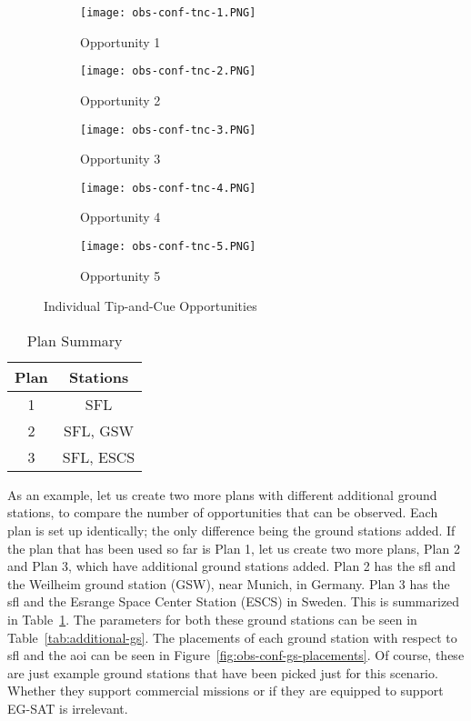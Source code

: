 \begin{figure}[h]
    \centering
    \begin{subfigure}[b]{0.32\textwidth}
	\centering
	\texttt{[image: obs-conf-tnc-1.PNG]} 
	\caption{Opportunity 1}
	\label{fig:obs-conf-tnc-1} 
    \end{subfigure}
    \hfill
    \begin{subfigure}[b]{0.32\textwidth}
	\centering
	\texttt{[image: obs-conf-tnc-2.PNG]} 
	\caption{Opportunity 2}
	\label{fig:obs-conf-tnc-2} 
    \end{subfigure}
    \hfill
    \begin{subfigure}[b]{0.32\textwidth}
	\centering
	\texttt{[image: obs-conf-tnc-3.PNG]} 
	\caption{Opportunity 3}
	\label{fig:obs-conf-tnc-3} 
    \end{subfigure}
    
    \begin{subfigure}[b]{0.32\textwidth}
	\centering
	\texttt{[image: obs-conf-tnc-4.PNG]} 
	\caption{Opportunity 4}
	\label{fig:obs-conf-tnc-4} 
    \end{subfigure}
    \quad \quad
    \begin{subfigure}[b]{0.32\textwidth}
	\centering
	\texttt{[image: obs-conf-tnc-5.PNG]} 
	\caption{Opportunity 5}
	\label{fig:obs-conf-tnc-5} 
    \end{subfigure}

    \caption{Individual Tip-and-Cue Opportunities}
\label{fig:obs-conf-tnc-opps}
\end{figure}

\begin{table}[h] 
    \centering
    \caption{Plan Summary}
    \begin{tabular}{cc}
	Plan & Stations \\ \hline
	1   &	SFL \\
	2   &	SFL, GSW \\
	3   &	SFL, ESCS 
    \end{tabular}
    \label{tab:additional-plans}
\end{table}

As an example, let us create two more plans with different additional ground
stations, to compare the number of opportunities that can be observed. Each plan is
set up identically; the only difference being the ground stations added. If the
plan that has been used so far is Plan 1, let us create two more plans,
Plan 2 and Plan 3, which have additional ground stations added.  Plan 2 has the
\gls{sfl} and the Weilheim ground station (GSW), near Munich, in Germany. Plan
3 has the \gls{sfl} and the Esrange Space Center Station (ESCS) in Sweden. This
is summarized in Table~\ref{tab:additional-plans}. The parameters for both
these ground stations can be seen in Table~\ref{tab:additional-gs}. The
placements of each ground station with respect to \gls{sfl} and the \gls{aoi}
can be seen in Figure~\ref{fig:obs-conf-gs-placements}. Of course, these are
just example ground stations that have been picked just for this scenario.
Whether they support commercial missions or if they are equipped to support
EG-SAT is irrelevant.  


